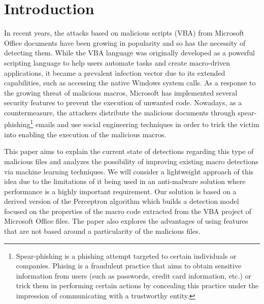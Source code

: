 \section{Introduction}
In recent years, the attacks based on malicious scripts (VBA) from Microsoft Office documents have been growing in popularity and so has the necessity of detecting them. While the VBA language was originally developed as a powerful scripting language to help users automate tasks and create macro-driven applications, it became a prevalent infection vector due to its extended capabilities, such as accessing the native Windows system calls. As a response to the growing threat of malicious macros, Microsoft has implemented several security features to prevent the execution of unwanted code. Nowadays, as a countermeasure, the attackers distribute the malicious documents through spear-phishing\footnote{Spear-phishing is a phishing attempt targeted to certain individuals or companies. Phising is a fraudulent practice that aims to obtain sensitive information from users (such as passwords, credit card information, etc.) or trick them in performing certain actions  by concealing this practice under the impression of communicating with a trustworthy entity.} emails and use social engineering techniques in order to trick the victim into enabling the execution of the malicious macros.
\par
This paper aims to explain the current state of detections regarding this type of malicious files and analyzes the possibility of improving existing macro detections via machine learning techniques. We will consider a lightweight approach of this idea due to the limitations of it being used in an anti-malware solution where performance is a highly important requirement. Our solution is based on a derived version of the Perceptron algorithm which builds a detection model focused on the properties of the macro code extracted from the VBA project of Microsoft Office files. The paper also explores the advantages of using features that are not based around a particularity of the malicious files.
